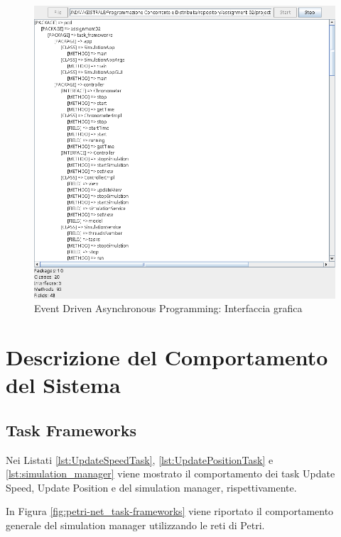 \documentclass[12pt,a4paper,openright,twoside]{book}
\begin{document}
\begin{figure}[H]
	\centering
	\includegraphics[width=\textwidth]{figures/project-analyzer-gui.png}
	\caption{Event Driven Asynchronous Programming: Interfaccia grafica}
	\label{fig:edapgui}
\end{figure}
\chapter{Descrizione del Comportamento del Sistema} %
\label{chap:Descrizione del Comportamento del Sistema}
\section{Task Frameworks}
Nei Listati \ref{lst:UpdateSpeedTask}, \ref{lst:UpdatePositionTask} e \ref{lst:simulation_manager} viene mostrato il comportamento dei task Update Speed, Update Position e del simulation manager, rispettivamente.

In Figura \ref{fig:petri-net_task-frameworks} viene riportato il comportamento generale del simulation manager utilizzando 
le reti di Petri.
\end{document}

